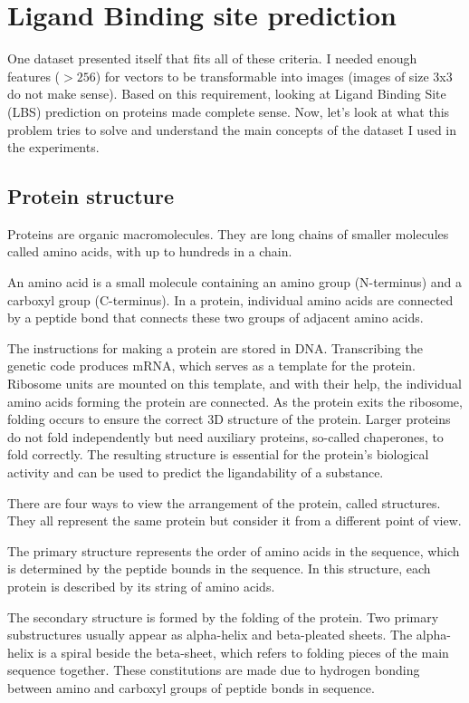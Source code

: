 \section{Ligand Binding site prediction}

One dataset presented itself that fits all of these criteria. I needed enough features ($> 256$) for vectors to be transformable into images (images of size 3x3 do not make sense). Based on this requirement, looking at Ligand Binding Site (LBS) prediction on proteins made complete sense. Now, let's look at what this problem tries to solve and understand the main concepts of the dataset I used in the experiments. 

\subsection{Protein structure}
\label{Protein_description}

Proteins are organic macromolecules. They are long chains of smaller molecules called amino acids, with up to hundreds in a chain.

An amino acid is a small molecule containing an amino group (N-terminus) and a carboxyl group (C-terminus). In a protein, individual amino acids are connected by a peptide bond that connects these two groups of adjacent amino acids.

The instructions for making a protein are stored in DNA. Transcribing the genetic code produces mRNA, which serves as a template for the protein. Ribosome units are mounted on this template, and with their help, the individual amino acids forming the protein are connected. As the protein exits the ribosome, folding occurs to ensure the correct 3D structure of the protein. Larger proteins do not fold independently but need auxiliary proteins, so-called chaperones, to fold correctly. The resulting structure is essential for the protein's biological activity and can be used to predict the ligandability of a substance.

There are four ways to view the arrangement of the protein, called structures. They all represent the same protein but consider it from a different point of view.

The primary structure represents the order of amino acids in the sequence, which is determined by the peptide bounds in the sequence. In this structure, each protein is described by its string of amino acids.

The secondary structure is formed by the folding of the protein. Two primary substructures usually appear as alpha-helix and beta-pleated sheets. The alpha-helix is a spiral beside the beta-sheet, which refers to folding pieces of the main sequence together. These constitutions are made due to hydrogen bonding between amino and carboxyl groups of peptide bonds in sequence.

